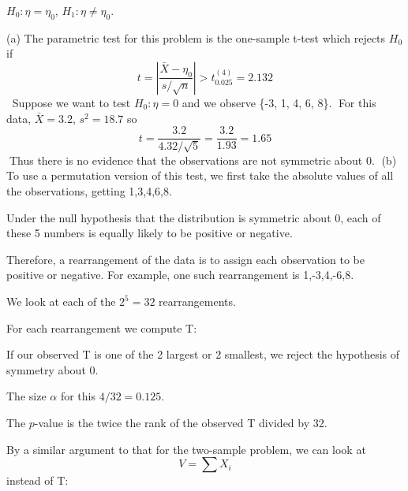 $H_0:\eta = \eta_0$, $H_1:\eta\neq \eta_0$.

(a)
The parametric test for this problem is the one-sample t-test which rejects $H_0$ if
$$
t = \left|\frac{\bar{X}-\eta_0}{s/\sqrt{n}}\right| > t^{(4)}_{0.025} = 2.132
$$Suppose we want to test $H_0:\eta=0$ and we observe \{-3, 1, 4, 6, 8\}.
For this data, $\bar{X}=3.2$, $s^2 = 18.7$ so
$$
t = \frac{3.2}{4.32/\sqrt{5}} = \frac{3.2}{1.93} = 1.65
$$Thus there is no evidence that the observations are not symmetric about $0$.
(b) To use a permutation version of this test, we first take the absolute
values of all the observations, getting 1,3,4,6,8. 

Under the null hypothesis that the distribution is symmetric about 0, each of these 5 numbers is equally likely to be positive or negative. 

Therefore, a rearrangement of the data is to assign each observation to be positive or negative. For example, one such rearrangement is 1,-3,4,-6,8. 

We look at each of the $2^5 = 32$ rearrangements. 

For each rearrangement we compute T: 

If our observed T is one of the 2 largest or 2 smallest, we reject the hypothesis of symmetry about 0. 

The size $\alpha$ for this $4/32 = 0.125$. 

The $p$-value is the twice the rank of the observed T divided by 32. 

By a similar argument to that for the two-sample problem, we can look at 
$$
V =\sum X_i
$$
instead of T:


\stopcontents[chapters]
\endinput
